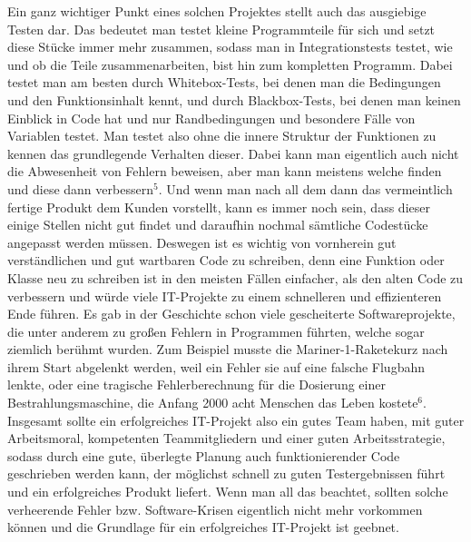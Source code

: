 \documentclass[12pt]{scrartcl}
\begin{document}
\newline
\newline
Ein ganz wichtiger Punkt eines solchen Projektes stellt auch das ausgiebige Testen dar. Das bedeutet man testet kleine Programmteile für sich und setzt diese Stücke immer mehr zusammen, sodass man in Integrationstests testet, wie und ob die Teile zusammenarbeiten, bist hin zum kompletten Programm. Dabei testet man am besten durch Whitebox-Tests, bei denen man die Bedingungen und den Funktionsinhalt kennt, und durch Blackbox-Tests, bei denen man keinen Einblick in Code hat und nur Randbedingungen und besondere Fälle von Variablen testet. Man testet also ohne die innere Struktur der Funktionen zu kennen das grundlegende Verhalten dieser. Dabei kann man eigentlich auch nicht die Abwesenheit von Fehlern beweisen, aber man kann meistens welche finden und diese dann verbessern$^5$.
\newline
\newline
Und wenn man nach all dem dann das vermeintlich fertige Produkt dem Kunden vorstellt, kann es immer noch sein, dass dieser einige Stellen nicht gut findet und daraufhin nochmal sämtliche Codestücke angepasst werden müssen. Deswegen ist es wichtig von vornherein gut verständlichen und gut wartbaren Code zu schreiben, denn eine Funktion oder Klasse neu zu schreiben ist in den meisten Fällen einfacher, als den alten Code zu verbessern und würde viele IT-Projekte zu einem schnelleren und effizienteren Ende führen.
\newline
\newline
Es gab in der Geschichte schon viele gescheiterte Softwareprojekte, die unter anderem zu großen Fehlern in Programmen führten, welche sogar ziemlich berühmt wurden. Zum Beispiel musste die \glqq Mariner-1-Rakete\grqq kurz nach ihrem Start abgelenkt werden, weil ein Fehler sie auf eine falsche Flugbahn lenkte, oder eine tragische Fehlerberechnung für die Dosierung einer Bestrahlungsmaschine, die Anfang 2000 acht Menschen das Leben kostete$^6$.
\newline
\newline
Insgesamt sollte ein erfolgreiches IT-Projekt also ein gutes Team haben, mit guter Arbeitsmoral, kompetenten Teammitgliedern und einer guten Arbeitsstrategie, sodass durch eine gute, überlegte Planung auch funktionierender Code geschrieben werden kann, der möglichst schnell zu guten Testergebnissen führt und ein erfolgreiches Produkt liefert.
\newline
Wenn man all das beachtet, sollten solche verheerende Fehler bzw. Software-Krisen eigentlich nicht mehr vorkommen können und die Grundlage für ein erfolgreiches IT-Projekt ist geebnet.
\end{document}
